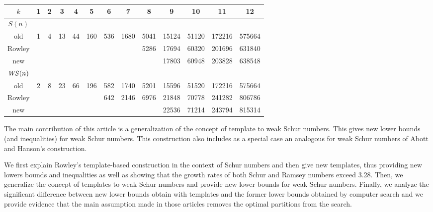 \begin{center}
\begin{tabular}{|*{13}{c|}}
    \hline
    \(k\) & 1 & 2 & 3 & 4 & 5 & 6 & 7 & 8 & 9 & 10 & 11 & 12 \\
    \hline
    \(S(n)\) & & & & & & & & & & & & \\
    old & 1 & 4 & 13 & 44 & 160 \cite{Heule2017} & 536 \cite{Fredricksen} & 1680 \cite{Fredricksen} & 5041 
    \cite{ELIAHOU2012175} & 15124 \cite{ELIAHOU2012175} & 51120 \cite{AbbottHanson} & 172216 
    \cite{AbbottHanson} & 575664 \cite{AbbottHanson} \\
    Rowley & & & & & & & & 5286 & 17694 & 60320 & 201696 & 631840 \\
    new & & & & & & & & & 17803 & 60948 & 203828 & 638548 \\
    \hline
    \(\mathit{WS}(n)\) & & & & & & & & & & & & \\
    old & 2 & 8 & 23 & 66 & 196 \cite{ELIAHOU2012175} & 582 \cite{EliahouBook} & 1740 
    \cite{Rafilipojaona} & 5201 \cite{Rafilipojaona} & 15596 \cite{Rafilipojaona} & 51520 & 172216 & 575664 \\
    Rowley & & & & & & 642 & 2146 & 6976 & 21848 & 70778 & 241282 & 806786 \\
    new & & & & & & & & & 22536 & 71214 & 243794 & 815314 \\
    \hline
\end{tabular}
\end{center}

\par The main contribution of this article is a generalization of the concept of template to weak Schur numbers. 
This gives new lower bounds (and inequalities) for weak Schur numbers. This construction also includes as a 
special case an analogous for weak Schur numbers of Abott and Hanson's construction.

\par We first explain Rowley's template-based construction in the context of Schur numbers and then give 
new templates, thus providing new lowers bounds and inequalities as well as showing that the growth rates 
of both Schur and Ramsey numbers exceed 3.28. Then, we generalize the concept of templates to weak Schur 
numbers and provide new lower bounds for weak Schur numbers. Finally, we analyze the significant difference 
between new lower bounds obtain with templates and the former lower bounds obtained by computer search 
and we provide evidence that the main assumption made in those articles removes the optimal partitions from 
the search.
